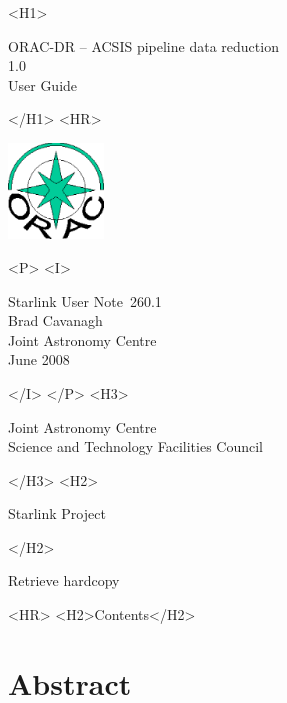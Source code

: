 \documentclass[twoside,11pt]{article}
\newcommand{\stardoccategory}  {Starlink User Note}
\newcommand{\stardocsource}    {sun\stardocnumber}
\newcommand{\stardocnumber}    {260.1}
\newcommand{\stardocauthors}   {Brad Cavanagh \\
                                Joint Astronomy Centre}
\newcommand{\stardocdate}      {June 2008}
\newcommand{\stardoctitle}     {ORAC-DR -- ACSIS pipeline data reduction}
\newcommand{\stardocversion}   {1.0}
\newcommand{\stardocmanual}    {User Guide}
\newcommand{\htmladdnormallink}[2]{#1}
\newcommand{\htmladdimg}[1]{}
\newcommand{\htmlref}[2]{#1}
\newcommand{\htmladdtonavigation}[1]{}
\newcommand{\xlabel}[1]{}
\renewcommand{\_}{\texttt{\symbol{95}}}
\begin{document}
\begin{htmlonly}
   \xlabel{}
   \begin{rawhtml} <H1> \end{rawhtml}
      \stardoctitle\\
      \stardocversion\\
      \stardocmanual
   \begin{rawhtml} </H1> <HR> \end{rawhtml}

\includegraphics[width=1.0in]{sun260_logo.eps}

   \begin{rawhtml} <P> <I> \end{rawhtml}
   \stardoccategory\ \stardocnumber \\
   \stardocauthors \\
   \stardocdate
   \begin{rawhtml} </I> </P> <H3> \end{rawhtml}
      \htmladdnormallink{Joint Astronomy Centre}
                        {http://www.jach.hawaii.edu/} \\
      \htmladdnormallink{Science and Technology Facilities Council}
                        {http://www.scitech.ac.uk/} \\
   \begin{rawhtml} </H3> <H2> \end{rawhtml}
      \htmladdnormallink{Starlink Project}{http://www.starlink.rl.ac.uk/}
   \begin{rawhtml} </H2> \end{rawhtml}
   \htmladdnormallink{\htmladdimg{source.gif} Retrieve hardcopy}
      {http://www.starlink.rl.ac.uk/cgi-bin/hcserver?\stardocsource}\\

  \label{stardoccontents}
  \begin{rawhtml} 
    <HR>
    <H2>Contents</H2>
  \end{rawhtml}
  \htmladdtonavigation{\htmlref{\htmladdimg{contents_motif.gif}}
        {stardoccontents}}

  \section{\xlabel{abstract}Abstract}
\end{htmlonly}
\end{document}
